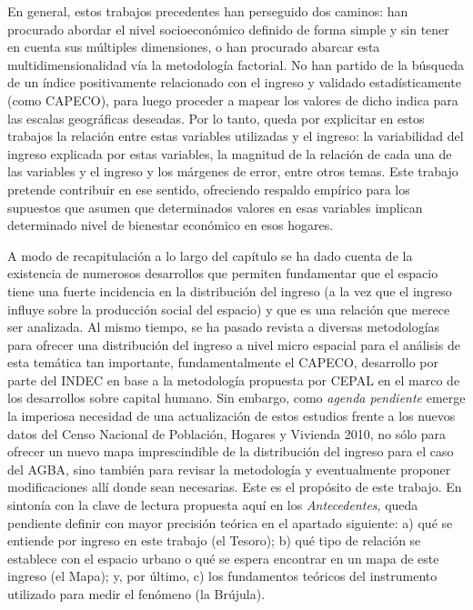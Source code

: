 En general, estos trabajos precedentes han perseguido dos caminos: han procurado abordar el nivel socioeconómico definido de forma simple y sin tener en cuenta sus múltiples dimensiones, o han procurado abarcar esta multidimensionalidad vía la metodología factorial. No han partido de la búsqueda de un índice positivamente relacionado con el ingreso y validado estadísticamente (como CAPECO), para luego proceder a mapear los valores de dicho indica para las escalas geográficas deseadas.  Por lo tanto, queda por explicitar en estos trabajos la relación entre estas variables utilizadas y el ingreso: la variabilidad del ingreso explicada por estas variables, la magnitud de la relación de cada una de las variables y el ingreso y los márgenes de error, entre otros temas. Este trabajo pretende contribuir en ese sentido, ofreciendo respaldo empírico para los supuestos que asumen que determinados valores en esas variables implican determinado nivel de bienestar económico en esos hogares.

A modo de recapitulación a lo largo del capítulo se ha dado cuenta de la existencia de numerosos desarrollos que permiten fundamentar que el espacio tiene una fuerte incidencia en la distribución del ingreso (a la vez que el ingreso influye sobre la producción social del espacio) y que es una relación que merece ser analizada. Al mismo tiempo, se ha pasado revista a diversas metodologías para ofrecer una distribución del ingreso a nivel micro espacial para el análisis de esta temática tan importante, fundamentalmente el CAPECO, desarrollo por parte del INDEC en base a la metodología propuesta por CEPAL en el marco de los desarrollos sobre capital humano. Sin embargo, como \textit{agenda pendiente} emerge la imperiosa necesidad de una actualización de estos estudios frente a los nuevos datos del Censo Nacional de Población, Hogares y Vivienda 2010, no sólo para ofrecer un nuevo mapa imprescindible de la distribución del ingreso para el caso del AGBA, sino también para revisar la metodología y eventualmente proponer modificaciones allí donde sean necesarias. Este es el propósito de este trabajo. En sintonía con la clave de lectura propuesta aquí en los \textit{Antecedentes}, queda pendiente definir con mayor precisión teórica en el apartado siguiente: a) qué se entiende por ingreso en este trabajo (el Tesoro); b) qué tipo de relación se establece con el espacio urbano o qué se espera encontrar en un mapa de este ingreso (el Mapa); y, por último, c) los fundamentos teóricos del instrumento utilizado para medir el fenómeno (la Brújula).

